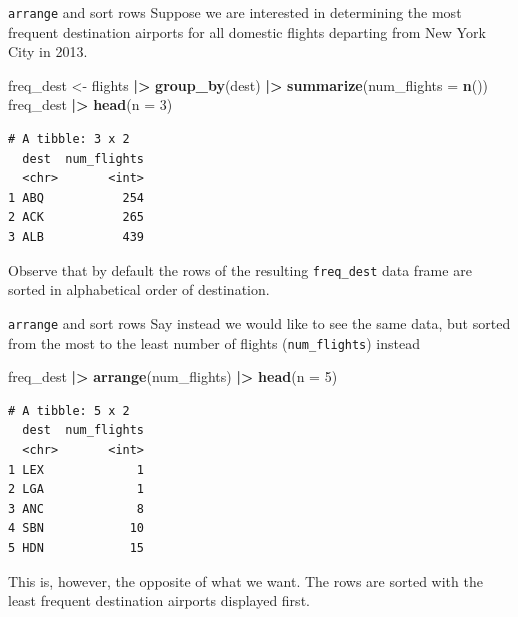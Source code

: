 \documentclass[
  ignorenonframetext,
]{beamer}
\newenvironment{Shaded}{\begin{snugshade}}{\end{snugshade}}
\newcommand{\AttributeTok}[1]{\textcolor[rgb]{0.13,0.29,0.53}{#1}}
\newcommand{\DecValTok}[1]{\textcolor[rgb]{0.00,0.00,0.81}{#1}}
\newcommand{\FunctionTok}[1]{\textcolor[rgb]{0.13,0.29,0.53}{\textbf{#1}}}
\newcommand{\NormalTok}[1]{#1}
\newcommand{\OtherTok}[1]{\textcolor[rgb]{0.56,0.35,0.01}{#1}}
\newcommand{\SpecialCharTok}[1]{\textcolor[rgb]{0.81,0.36,0.00}{\textbf{#1}}}
\begin{document}
\begin{frame}[fragile]{\texttt{arrange} and sort rows}
\label{arrange-and-sort-rows-1}
Suppose we are interested in determining the most frequent destination
airports for all domestic flights departing from New York City in 2013.

\normalsize

\begin{Shaded}
\begin{Highlighting}[]
\NormalTok{freq\_dest }\OtherTok{\textless{}{-}}\NormalTok{ flights }\SpecialCharTok{|\textgreater{}} 
  \FunctionTok{group\_by}\NormalTok{(dest) }\SpecialCharTok{|\textgreater{}} 
  \FunctionTok{summarize}\NormalTok{(}\AttributeTok{num\_flights =} \FunctionTok{n}\NormalTok{())}
\NormalTok{freq\_dest }\SpecialCharTok{|\textgreater{}} \FunctionTok{head}\NormalTok{(}\AttributeTok{n =} \DecValTok{3}\NormalTok{)}
\end{Highlighting}
\end{Shaded}

\begin{verbatim}
# A tibble: 3 x 2
  dest  num_flights
  <chr>       <int>
1 ABQ           254
2 ACK           265
3 ALB           439
\end{verbatim}

\normalsize

Observe that by default the rows of the resulting \texttt{freq\_dest}
data frame are sorted in alphabetical order of destination.
\end{frame}

\begin{frame}[fragile]{\texttt{arrange} and sort rows}
\label{arrange-and-sort-rows-2}
Say instead we would like to see the same data, but sorted from the most
to the least number of flights (\texttt{num\_flights}) instead

\normalsize

\begin{Shaded}
\begin{Highlighting}[]
\NormalTok{freq\_dest }\SpecialCharTok{|\textgreater{}} 
  \FunctionTok{arrange}\NormalTok{(num\_flights) }\SpecialCharTok{|\textgreater{}} 
  \FunctionTok{head}\NormalTok{(}\AttributeTok{n =} \DecValTok{5}\NormalTok{)}
\end{Highlighting}
\end{Shaded}

\begin{verbatim}
# A tibble: 5 x 2
  dest  num_flights
  <chr>       <int>
1 LEX             1
2 LGA             1
3 ANC             8
4 SBN            10
5 HDN            15
\end{verbatim}

\normalsize

This is, however, the opposite of what we want. The rows are sorted with
the least frequent destination airports displayed first.
\end{frame}
\end{document}
